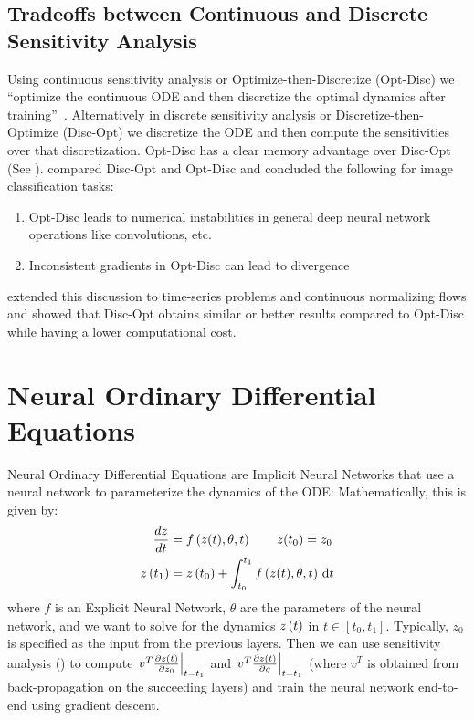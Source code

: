 \subsection{Tradeoffs between Continuous and Discrete Sensitivity Analysis}
\label{subsec:discussion_on_sensitivity_analysis_optimize_then_discretize_vs_discretize_then_optimize}

Using continuous sensitivity analysis or Optimize-then-Discretize (Opt-Disc) we ``optimize the continuous ODE and then discretize the optimal dynamics after training''~\citep{onken2020discretize}. Alternatively in discrete sensitivity analysis or Discretize-then-Optimize (Disc-Opt) we discretize the ODE and then compute the sensitivities over that discretization. Opt-Disc has a clear memory advantage over Disc-Opt (See ). \citet{gholami2019anode} compared Disc-Opt and Opt-Disc and concluded the following for image classification tasks:
%
\begin{enumerate}
  \item Opt-Disc leads to numerical instabilities in general deep neural network operations like convolutions, etc.
  \item Inconsistent gradients in Opt-Disc can lead to divergence
\end{enumerate}
%
\citet{onken2020discretize} extended this discussion to time-series problems and continuous normalizing flows and showed that Disc-Opt obtains similar or better results compared to Opt-Disc while having a lower computational cost.

\section{Neural Ordinary Differential Equations}
\label{sec:neural_odes}

Neural Ordinary Differential Equations are Implicit Neural Networks that use a neural network to parameterize the dynamics of the ODE: Mathematically, this is given by:
%
\begin{align}
  \frac{dz}{dt} & = f\left(z(t), \theta, t\right) \qquad z(t_0) = z_0                     \\
  z\left(t_1\right) & = z\left(t_0\right) + \int_{t_0}^{t_1} f\left(z(t), \theta, t\right) \, \mathrm{d}t
\end{align}
%
where $f$ is an Explicit Neural Network, $\theta$ are the parameters of the neural network, and we want to solve for the dynamics $z\left(t\right)$ in $t \in [t_0, t_1]$. Typically, $z_0$ is specified as the input from the previous layers. Then we can use sensitivity analysis () to compute $\left. v^T \frac{\partial z\left(t\right)}{\partial z_0} \right|_{t = t_1}$ and $\left. v^T \frac{\partial z\left(t\right)}{\partial g} \right|_{t = t_1}$ (where $v^T$ is obtained from back-propagation on the succeeding layers) and train the neural network end-to-end using gradient descent.

